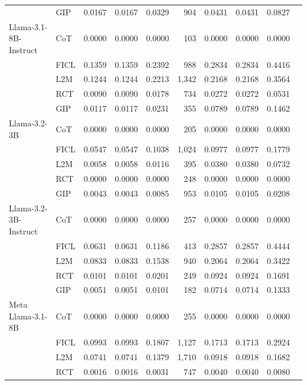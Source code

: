 \documentclass[conference]{IEEEtran}
\begin{document}
\begin{longtable}{p{3.5cm} l r r r r r r r r}
           & GIP  & 0.0167 & 0.0167 & 0.0329 & 904 & 0.0431 & 0.0431 & 0.0827 \\ \addlinespace
Llama-3.1-8B-Instruct & CoT  & 0.0000 & 0.0000 & 0.0000 & 103 & 0.0000 & 0.0000 & 0.0000 \\
                      & FICL & 0.1359 & 0.1359 & 0.2392 & 988 & 0.2834 & 0.2834 & 0.4416 \\
                      & L2M  & 0.1244 & 0.1244 & 0.2213 & 1,342 & 0.2168 & 0.2168 & 0.3564 \\
                      & RCT  & 0.0090 & 0.0090 & 0.0178 & 734 & 0.0272 & 0.0272 & 0.0531 \\
                      & GIP  & 0.0117 & 0.0117 & 0.0231 & 355 & 0.0789 & 0.0789 & 0.1462 \\ \addlinespace
Llama-3.2-3B & CoT  & 0.0000 & 0.0000 & 0.0000 & 205 & 0.0000 & 0.0000 & 0.0000 \\
             & FICL & 0.0547 & 0.0547 & 0.1038 & 1,024 & 0.0977 & 0.0977 & 0.1779 \\
             & L2M  & 0.0058 & 0.0058 & 0.0116 & 395 & 0.0380 & 0.0380 & 0.0732 \\
             & RCT  & 0.0000 & 0.0000 & 0.0000 & 248 & 0.0000 & 0.0000 & 0.0000 \\
             & GIP  & 0.0043 & 0.0043 & 0.0085 & 953 & 0.0105 & 0.0105 & 0.0208 \\ \addlinespace
Llama-3.2-3B-Instruct & CoT  & 0.0000 & 0.0000 & 0.0000 & 257 & 0.0000 & 0.0000 & 0.0000 \\
                      & FICL & 0.0631 & 0.0631 & 0.1186 & 413 & 0.2857 & 0.2857 & 0.4444 \\
                      & L2M  & 0.0833 & 0.0833 & 0.1538 & 940 & 0.2064 & 0.2064 & 0.3422 \\
                      & RCT  & 0.0101 & 0.0101 & 0.0201 & 249 & 0.0924 & 0.0924 & 0.1691 \\
                      & GIP  & 0.0051 & 0.0051 & 0.0101 & 182 & 0.0714 & 0.0714 & 0.1333 \\ \addlinespace
Meta Llama-3.1-8B & CoT  & 0.0000 & 0.0000 & 0.0000 & 255 & 0.0000 & 0.0000 & 0.0000 \\
                  & FICL & 0.0993 & 0.0993 & 0.1807 & 1,127 & 0.1713 & 0.1713 & 0.2924 \\
                  & L2M  & 0.0741 & 0.0741 & 0.1379 & 1,710 & 0.0918 & 0.0918 & 0.1682 \\
                  & RCT  & 0.0016 & 0.0016 & 0.0031 & 747 & 0.0040 & 0.0040 & 0.0080 \\

\end{longtable}
\end{document}
